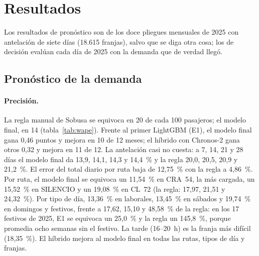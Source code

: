 \section{Resultados}
\label{sec:resultados}

Los resultados de pronóstico son de los doce pliegues mensuales de 2025 con antelación de siete días (18.615
franjas), salvo que se diga otra cosa; los de decisión evalúan cada día de 2025 con la demanda que de verdad llegó.

\subsection{Pronóstico de la demanda}
\label{sec:res-pronostico}

\paragraph{Precisión.} La regla manual de Sobusa se equivoca en 20 de cada 100 pasajeros; el modelo final, en 14
(tabla~\ref{tab:wape}). Frente al primer LightGBM (E1), el modelo final gana 0,46 puntos y mejora en 10 de 12 meses; el
híbrido con Chronos-2 gana otros 0,32 y mejora en 11 de 12. La antelación casi no cuesta: a 7, 14, 21 y 28 días el
modelo final da 13,9, 14,1, 14,3 y 14,4~\% y la regla 20,0, 20,5, 20,9 y 21,2~\%. El error del total diario por ruta baja
de 12,75~\% con la regla a 4,86~\%. Por ruta, el modelo final se equivoca un 11,54~\% en CRA~54, la más cargada, un
15,52~\% en SILENCIO y un 19,08~\% en CL~72 (la regla: 17,97, 21,51 y 24,32~\%). Por tipo de día, 13,36~\% en laborales,
13,45~\% en sábados y 19,74~\% en domingos y festivos, frente a 17,62, 15,10 y 48,58~\% de la regla: en los 17 festivos de
2025, E1 se equivoca un 25,0~\% y la regla un 145,8~\%, porque promedia ocho semanas sin el festivo. La tarde (16--20~h)
es la franja más difícil (18,35~\%). El híbrido mejora al modelo final en todas las rutas, tipos de día y franjas.


